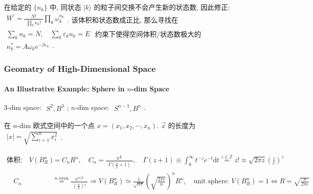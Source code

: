 \documentclass[../../main.tex]{subfiles}
\begin{document}
    在给定的 $\{n_{k}\}$ 中, 同状态 $|k\rangle$ 的粒子间交换不会产生新的状态数, 因此修正: $\begin{aligned}
        W^{\prime} = \frac{N!}{\begin{aligned}
            \prod_{k}n_{k}!
        \end{aligned}}\prod_{k}\omega_{k}^{n_{k}}
    \end{aligned}$. 该体积和状态数成正比, 那么寻找在 $\begin{aligned}
        \sum_{k}n_{k} = N,\quad\sum_{k}\varepsilon_{k}n_{k} = E
    \end{aligned}$ 约束下使得空间体积/状态数极大的 $\begin{aligned}
         n_{k}^{*} = A\omega_{k}e^{-\beta\varepsilon_{k}}
    \end{aligned}$. 

    \subsubsection{Geomatry of High-Dimensional Space}
    \paragraph{An Illustrative Example: Sphere in $n$-dim Space} 
    
    3-dim space: $\begin{aligned}
        S^{2}, B^{3}
    \end{aligned}$; $n$-dim space: $\begin{aligned}
        S^{n-1}, B^{n}
    \end{aligned}$. 

    在 $n$-dim 欧式空间中的一个点 $x = (x_{1},x_{2},\cdots, x_{n})$. $\vec{x}$ 的长度为 $\begin{aligned}
        |x| = \sqrt{\sum_{i=1}^{n}x_{i}^{2}}
    \end{aligned}$.

    $\begin{aligned}
        \text{体积:}\quad V\left(B_{R}^{n}\right) &= C_{n}R^{n},\quad C_{n} = \frac{\pi^{\frac{n}{2}}}{\begin{aligned}
            \Gamma\left(\frac{n}{2}+1\right)
        \end{aligned}},\quad \Gamma(z+1)\equiv \int_{0}^{\infty}t^{-z} e^{-t}\mathrm{d}t\stackrel{z\in\mathbb{Z}}{=} z!\approx \sqrt{2\pi z}\left(\frac{z}{e}\right)^{z}\\
        \quad C_{n} &\stackrel{n\text{ even}}{=} \frac{\pi^{n/2}}{\begin{aligned}
            \left(\frac{n}{2}\right)!
        \end{aligned}}\Rightarrow V\left(B_{R}^{n}\right) \simeq \frac{1}{\sqrt{n\pi}}\left(\sqrt{\frac{2\pi e}{n}}\right)^{n}R^{n},\quad \text{unit sphere: }V\left(B_{R}^{n}\right) = 1\Leftrightarrow R = \sqrt{\frac{n}{2\pi e}}
    \end{aligned}$
\end{document}
